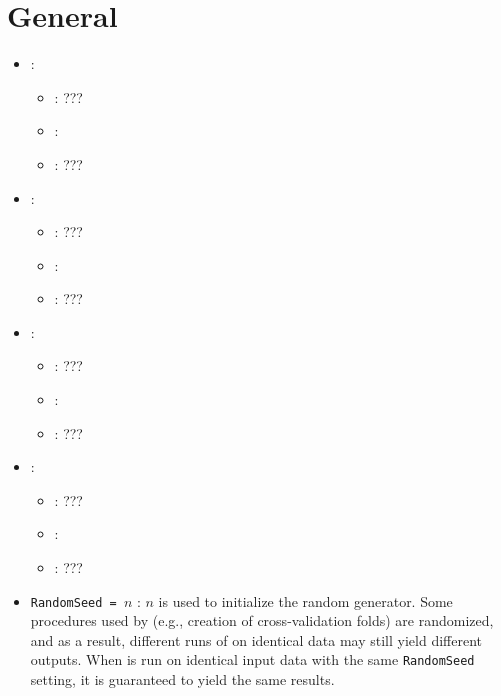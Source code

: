 
\section{General}

\begin{itemize}
    \item {}:
           \begin{itemize}
                \item \optionPossibleValues{}: ???
                \item \optionDefaultValue{}: 
                \item \optionDescrption{}: ???
           \end{itemize}
    \item {}:
           \begin{itemize}
                \item \optionPossibleValues{}: ???
                \item \optionDefaultValue{}: 
                \item \optionDescrption{}: ???
           \end{itemize}
    \item {}:
           \begin{itemize}
                \item \optionPossibleValues{}: ???
                \item \optionDefaultValue{}: 
                \item \optionDescrption{}: ???
           \end{itemize}
    \item {}:
           \begin{itemize}
                \item \optionPossibleValues{}: ???
                \item \optionDefaultValue{}: 
                \item \optionDescrption{}: ???
           \end{itemize}
\end{itemize}


\begin{itemize}
	\item {\tt RandomSeed = $n$}\label{sett:seed} : $n$ is used to initialize the random generator.
	Some procedures used by \clus{} (e.g., creation of cross-validation folds) are randomized, and as a result, different runs of \clus{} on identical data may still yield different outputs.  When \clus{} is run on identical input data with the same {\tt RandomSeed} setting, it is guaranteed to yield the same results.
\end{itemize}
